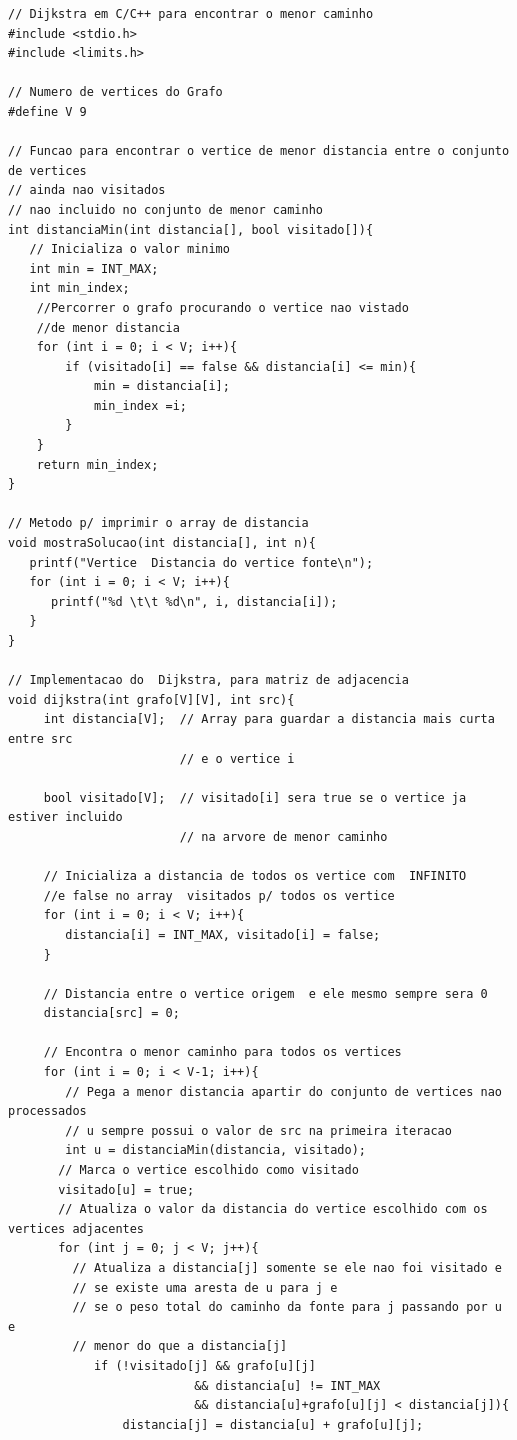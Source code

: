 \documentclass[12pt]{article}
\begin{document}
\begin{lstlisting}
// Dijkstra em C/C++ para encontrar o menor caminho
#include <stdio.h>
#include <limits.h>

// Numero de vertices do Grafo
#define V 9

// Funcao para encontrar o vertice de menor distancia entre o conjunto de vertices
// ainda nao visitados 
// nao incluido no conjunto de menor caminho
int distanciaMin(int distancia[], bool visitado[]){
   // Inicializa o valor minimo
   int min = INT_MAX;
   int min_index;
	//Percorrer o grafo procurando o vertice nao vistado
	//de menor distancia
	for (int i = 0; i < V; i++){
		if (visitado[i] == false && distancia[i] <= min){
			min = distancia[i];
			min_index =i;
		}
	}
    return min_index;
}

// Metodo p/ imprimir o array de distancia
void mostraSolucao(int distancia[], int n){
   printf("Vertice  Distancia do vertice fonte\n");
   for (int i = 0; i < V; i++){
      printf("%d \t\t %d\n", i, distancia[i]);
   }
}

// Implementacao do  Dijkstra, para matriz de adjacencia
void dijkstra(int grafo[V][V], int src){
     int distancia[V];  // Array para guardar a distancia mais curta entre src
						// e o vertice i 

     bool visitado[V];  // visitado[i] sera true se o vertice ja estiver incluido 
						// na arvore de menor caminho 

     // Inicializa a distancia de todos os vertice com  INFINITO 
	 //e false no array  visitados p/ todos os vertice
     for (int i = 0; i < V; i++){
        distancia[i] = INT_MAX, visitado[i] = false;
	 }

     // Distancia entre o vertice origem  e ele mesmo sempre sera 0
     distancia[src] = 0;

     // Encontra o menor caminho para todos os vertices
     for (int i = 0; i < V-1; i++){
		// Pega a menor distancia apartir do conjunto de vertices nao processados
		// u sempre possui o valor de src na primeira iteracao
		int u = distanciaMin(distancia, visitado);
       // Marca o vertice escolhido como visitado
       visitado[u] = true;
       // Atualiza o valor da distancia do vertice escolhido com os vertices adjacentes
       for (int j = 0; j < V; j++){
         // Atualiza a distancia[j] somente se ele nao foi visitado e 
		 // se existe uma aresta de u para j e 
		 // se o peso total do caminho da fonte para j passando por u e
		 // menor do que a distancia[j]
			if (!visitado[j] && grafo[u][j] 
						  && distancia[u] != INT_MAX 
						  && distancia[u]+grafo[u][j] < distancia[j]){
				distancia[j] = distancia[u] + grafo[u][j];
		

\end{lstlisting}
\end{document}
